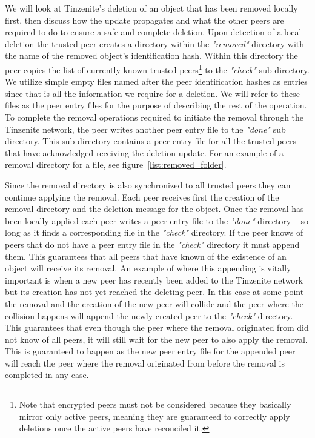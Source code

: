 We will look at Tinzenite's deletion of an object that has been removed locally first, then discuss how the update propagates and what the other peers are required to do to ensure a safe and complete deletion.
Upon detection of a local deletion the trusted peer creates a directory within the \textit{"removed"} directory with the name of the removed object's identification hash.
Within this directory the peer copies the list of currently known trusted peers\footnote{Note that encrypted peers must not be considered because they basically mirror only active peers, meaning they are guaranteed to correctly apply deletions once the active peers have reconciled it.} to the \textit{"check"} sub directory.
We utilize simple empty files named after the peer identification hashes as entries since that is all the information we require for a deletion.
We will refer to these files as the peer entry files for the purpose of describing the rest of the operation.
To complete the removal operations required to initiate the removal through the Tinzenite network, the peer writes another peer entry file to the \textit{"done"} sub directory.
This sub directory contains a peer entry file for all the trusted peers that have acknowledged receiving the deletion update.
For an example of a removal directory for a file, see figure~\ref{list:removed_folder}.

Since the removal directory is also synchronized to all trusted peers they can continue applying the removal.
Each peer receives first the creation of the removal directory and the deletion message for the object.
Once the removal has been locally applied each peer writes a peer entry file to the \textit{"done"} directory -- so long as it finds a corresponding file in the \textit{"check"} directory.
If the peer knows of peers that do not have a peer entry file in the \textit{"check"} directory it must append them.
This guarantees that all peers that have known of the existence of an object will receive its removal.
An example of where this appending is vitally important is when a new peer has recently been added to the Tinzenite network but its creation has not yet reached the deleting peer.
In this case at some point the removal and the creation of the new peer will collide and the peer where the collision happens will append the newly created peer to the \textit{"check"} directory.
This guarantees that even though the peer where the removal originated from did not know of all peers, it will still wait for the new peer to also apply the removal.
This is guaranteed to happen as the new peer entry file for the appended peer will reach the peer where the removal originated from before the removal is completed in any case.

